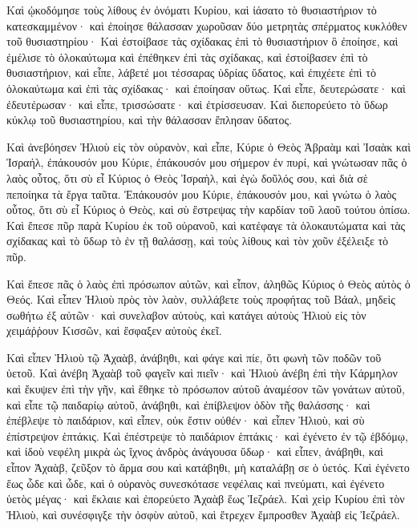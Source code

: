 {Καὶ ᾠκοδόμησε τοὺς λίθους ἐν ὀνόματι Κυρίου, καὶ ἰάσατο τὸ θυσιαστήριον τὸ κατεσκαμμένον· καὶ ἐποίησε θάλασσαν χωροῦσαν δύο μετρητὰς σπέρματος κυκλόθεν τοῦ θυσιαστηρίου·
Καὶ ἐστοίβασε τὰς σχίδακας ἐπὶ τὸ θυσιαστήριον ὃ ἐποίησε, καὶ ἐμέλισε τὸ ὁλοκαύτωμα καὶ ἐπέθηκεν ἐπὶ τὰς σχίδακας, καὶ ἐστοίβασεν ἐπὶ τὸ θυσιαστήριον,
καὶ εἶπε, λάβετέ μοι τέσσαρας ὑδρίας ὕδατος, καὶ ἐπιχέετε ἐπὶ τὸ ὁλοκαύτωμα καὶ ἐπὶ τὰς σχίδακας· καὶ ἐποίησαν οὕτως. Καὶ εἶπε, δευτερώσατε· καὶ ἐδευτέρωσαν· καὶ εἶπε, τρισσώσατε· καὶ ἐτρίσσευσαν.
Καὶ διεπορεύετο τὸ ὕδωρ κύκλῳ τοῦ θυσιαστηρίου, καὶ τὴν θάλασσαν ἔπλησαν ὕδατος.
\par }{\PP {}Καὶ ἀνεβόησεν Ἠλιοὺ εἰς τὸν οὐρανὸν, καὶ εἶπε, Κύριε ὁ Θεὸς Ἁβραὰμ καὶ Ἰσαὰκ καὶ Ἰσραήλ, ἐπάκουσόν μου Κύριε, ἐπάκουσόν μου σήμερον ἐν πυρί, καὶ γνώτωσαν πᾶς ὁ λαὸς οὗτος, ὅτι σὺ εἶ Κύριος ὁ Θεὸς Ἰσραὴλ, καὶ ἐγὼ δοῦλός σου, καὶ διὰ σὲ πεποίηκα τὰ ἔργα ταῦτα.
Ἐπάκουσόν μου Κύριε, ἐπάκουσόν μου, καὶ γνώτω ὁ λαὸς οὗτος, ὅτι σὺ εἶ Κύριος ὁ Θεὸς, καὶ σὺ ἔστρεψας τὴν καρδίαν τοῦ λαοῦ τούτου ὀπίσω.
Καὶ ἔπεσε πῦρ παρὰ Κυρίου ἐκ τοῦ οὐρανοῦ, καὶ κατέφαγε τὰ ὁλοκαυτώματα καὶ τὰς σχίδακας καὶ τὸ ὕδωρ τὸ ἐν τῇ θαλάσσῃ, καὶ τοὺς λίθους καὶ τὸν χοῦν ἐξέλειξε τὸ πῦρ.
\par }{\PP {}Καὶ ἔπεσε πᾶς ὁ λαὸς ἐπὶ πρόσωπον αὐτῶν, καὶ εἶπον, ἀληθῶς Κύριος ὁ Θεὸς αὐτὸς ὁ Θεός.
Καὶ εἶπεν Ἠλιοὺ πρὸς τὸν λαὸν, συλλάβετε τοὺς προφήτας τοῦ Βάαλ, μηδεὶς σωθήτω ἐξ αὐτῶν· καὶ συνελαβον αὐτοὺς, καὶ κατάγει αὐτοὺς Ἠλιοὺ εἰς τὸν χειμάῤῥουν Κισσῶν, καὶ ἔσφαξεν αὐτοὺς ἐκεῖ.
\par }{\PP {}Καὶ εἶπεν Ἠλιοὺ τῷ Ἀχαὰβ, ἀνάβηθι, καὶ φάγε καὶ πίε, ὅτι φωνὴ τῶν ποδῶν τοῦ ὑετοῦ.
Καὶ ἀνέβη Ἀχαὰβ τοῦ φαγεῖν καὶ πιεῖν· καὶ Ἠλιοὺ ἀνέβη ἐπὶ τὴν Κάρμηλον καὶ ἔκυψεν ἐπὶ τὴν γῆν, καὶ ἔθηκε τὸ πρόσωπον αὐτοῦ ἀναμέσον τῶν γονάτων αὐτοῦ,
καὶ εἶπε τῷ παιδαρίῳ αὐτοῦ, ἀνάβηθι, καὶ ἐπίβλεψον ὁδὸν τῆς θαλάσσης· καὶ ἐπέβλεψε τὸ παιδάριον, καὶ εἶπεν, οὐκ ἔστιν οὐθέν· καὶ εἶπεν Ἠλιοὺ, καὶ σὺ ἐπίστρεψον ἑπτάκις.
Καὶ ἐπέστρεψε τὸ παιδάριον ἑπτάκις· καὶ ἐγένετο ἐν τῷ ἑβδόμῳ, καὶ ἰδοὺ νεφέλη μικρὰ ὡς ἴχνος ἀνδρὸς ἀνάγουσα ὕδωρ· καὶ εἶπεν, ἀνάβηθι, καὶ εἶπον Ἀχαὰβ, ζεῦξον τὸ ἅρμα σου καὶ κατάβηθι, μὴ καταλάβῃ σε ὁ ὑετός.
Καὶ ἐγένετο ἕως ὧδε καὶ ὧδε, καὶ ὁ οὐρανὸς συνεσκότασε νεφέλαις καὶ πνεύματι, καὶ ἐγένετο ὑετὸς μέγας· καὶ ἔκλαιε καὶ ἐπορεύετο Ἀχαὰβ ἕως Ἰεζράελ.
Καὶ χεὶρ Κυρίου ἐπὶ τὸν Ἠλιοὺ, καὶ συνέσφιγξε τὴν ὀσφὺν αὐτοῦ, καὶ ἔτρεχεν ἔμπροσθεν Ἀχαὰβ εἰς Ἰεζράελ.

}
